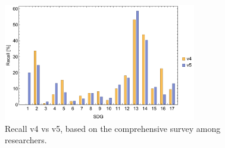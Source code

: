 \documentclass{article}
\begin{document}
\begin{figure}[H]
	\centering
  \includegraphics[width=0.75\textwidth]{figures/recallbarchart.pdf}
	\caption{Recall v4 vs v5, based on the comprehensive survey among researchers.}
	\label{recallbarchart}
\end{figure}
\end{document}
